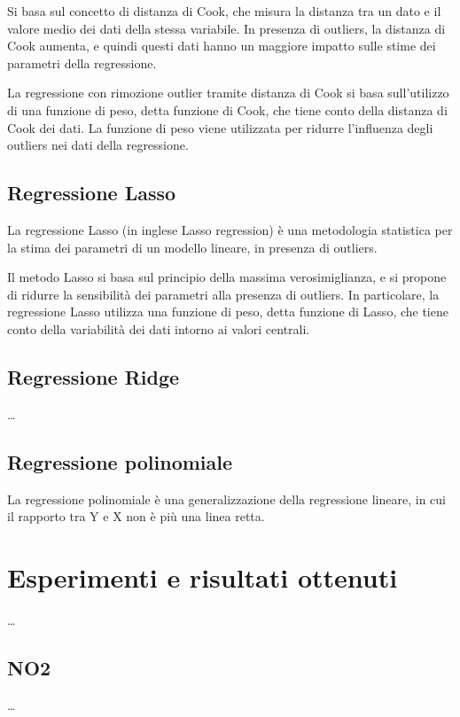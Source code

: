 Si basa sul concetto di distanza di Cook, che misura la distanza tra un dato e il valore medio dei dati della stessa variabile. In presenza di outliers, la distanza di Cook aumenta, e quindi questi dati hanno un maggiore impatto sulle stime dei parametri della regressione.

La regressione con rimozione outlier tramite distanza di Cook si basa sull'utilizzo di una funzione di peso, detta funzione di Cook, che tiene conto della distanza di Cook dei dati. La funzione di peso viene utilizzata per ridurre l'influenza degli outliers nei dati della regressione.

\subsection{Regressione Lasso}\label{ssec:regressione-lasso}
La regressione Lasso (in inglese Lasso regression) è una metodologia statistica per la stima dei parametri di un modello lineare, in presenza di outliers.

Il metodo Lasso si basa sul principio della massima verosimiglianza, e si propone di ridurre la sensibilità dei parametri alla presenza di outliers. In particolare, la regressione Lasso utilizza una funzione di peso, detta funzione di Lasso, che tiene conto della variabilità dei dati intorno ai valori centrali.

\subsection{Regressione Ridge}\label{ssec:regressione-ridge}
\ldots

\subsection{Regressione polinomiale}\label{ssec:regressione-polinomiale}
La regressione polinomiale è una generalizzazione della regressione lineare, in cui il rapporto tra Y e X non è più una linea retta.

\section{Esperimenti e risultati ottenuti}\label{sec:esperimenti}
\ldots

\subsection{NO2}\label{ssec:risultati-no2}
\ldots

